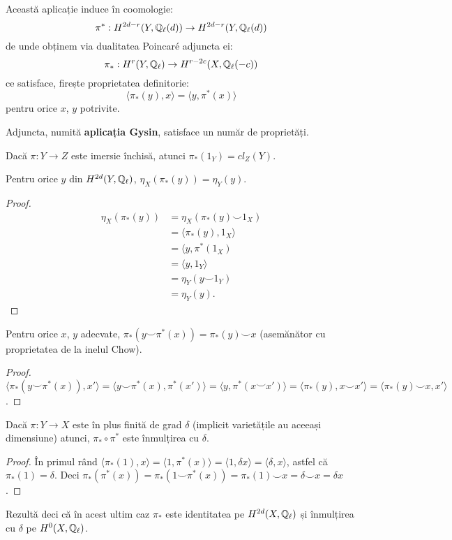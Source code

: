 \documentclass[13pt,openany]{book}
\begin{document}
Această aplicație induce în coomologie:
$$\pi^*: H^{2d-r}(Y,\mathbb{Q}_\ell(d)) \rightarrow H^{2d-r}(Y,\mathbb{Q}_\ell(d))$$
de unde obținem via dualitatea Poincaré adjuncta ei:
$$\pi_* : H^r(Y,\mathbb{Q}_\ell) \rightarrow H^{r-2c}(X,\mathbb{Q}_\ell(-c))$$
ce satisface, firește proprietatea definitorie:
$$\langle \pi_*(y),x \rangle=\langle y,\pi^*(x)\rangle$$
pentru orice $x$, $y$ potrivite.

Adjuncta, numită {\bf aplicația Gysin}, satisface un număr de proprietăți.

\begin{propr}
Dacă $\pi : Y \rightarrow Z$ este imersie închisă, atunci $\pi_*(1_Y)=cl_Z(Y)$.
\end{propr}

\begin{propr}
Pentru orice $y$ din $H^{2d}(Y,\mathbb{Q}_\ell)$, $\eta_X(\pi_*(y))=\eta_Y(y)$.
\end{propr}

\begin{proof}
\begin{align*}
\eta_X(\pi_*(y))&=\eta_X(\pi_*(y)\smile 1_X)\\
&=\langle \pi_*(y), 1_X \rangle \\
&= \langle y, \pi^*(1_X) \\
&= \langle y, 1_Y \rangle \\
&= \eta_Y (y \smile 1_Y) \\
&= \eta_Y(y).
\end{align*}
\end{proof}

\begin{propr}
Pentru orice $x$, $y$ adecvate, $\pi_*(y \smile \pi^*(x)) = \pi_*(y) \smile x$ (asemănător cu proprietatea de la inelul Chow).
\end{propr}

\begin{proof}
$\langle \pi_*(y \smile \pi^*(x)), x' \rangle = \langle y \smile \pi^*(x), \pi^*(x') \rangle = \langle y, \pi^*(x \smile x') \rangle = \langle \pi_*(y),x\smile x' \rangle = \langle \pi_*(y) \smile x, x' \rangle$.
\end{proof}

\begin{propr}
Dacă $\pi:Y \rightarrow X$ este în plus finită de grad $\delta$ (implicit varietățile au aceeași dimensiune) atunci, $\pi_* \circ \pi^*$ este înmulțirea cu $\delta$.
\end{propr}

\begin{proof}
În primul rând $\langle \pi_*(1),x\rangle = \langle1,\pi^*(x)\rangle = \langle1,\delta x\rangle = \langle \delta,x\rangle$, astfel că $\pi_*(1)=\delta$.
Deci $\pi_*(\pi^*(x)) = \pi_*(1 \smile \pi^*(x)) = \pi_*(1) \smile x = \delta \smile x = \delta x$.
\end{proof}
Rezultă deci că în acest ultim caz $\pi_*$ este identitatea pe $H^{2d}(X,\mathbb{Q}_\ell)$ și înmulțirea cu $\delta$ pe $H^0(X,\mathbb{Q}_\ell)$.
\end{document}
